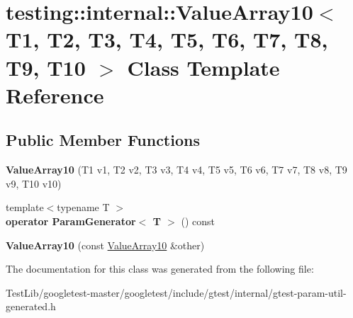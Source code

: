 \hypertarget{classtesting_1_1internal_1_1ValueArray10}{}\section{testing\+:\+:internal\+:\+:Value\+Array10$<$ T1, T2, T3, T4, T5, T6, T7, T8, T9, T10 $>$ Class Template Reference}
\label{classtesting_1_1internal_1_1ValueArray10}
\subsection*{Public Member Functions}
\begin{DoxyCompactItemize}
\item 
\mbox{\label{classtesting_1_1internal_1_1ValueArray10_a763527165bcd1d8e7c366f979b76736b}} 
{\bfseries Value\+Array10} (T1 v1, T2 v2, T3 v3, T4 v4, T5 v5, T6 v6, T7 v7, T8 v8, T9 v9, T10 v10)
\item 
\mbox{\label{classtesting_1_1internal_1_1ValueArray10_afa8855c713997ae82781159f3a3d53fc}} 
{\footnotesize template$<$typename T $>$ }\\{\bfseries operator Param\+Generator$<$ T $>$} () const
\item 
\mbox{\label{classtesting_1_1internal_1_1ValueArray10_a05195c20e50321e51b2502c71c5ec8fa}} 
{\bfseries Value\+Array10} (const \hyperlink{classtesting_1_1internal_1_1ValueArray10}{Value\+Array10} \&other)
\end{DoxyCompactItemize}


The documentation for this class was generated from the following file\+:\begin{DoxyCompactItemize}
\item 
Test\+Lib/googletest-\/master/googletest/include/gtest/internal/gtest-\/param-\/util-\/generated.\+h\end{DoxyCompactItemize}
